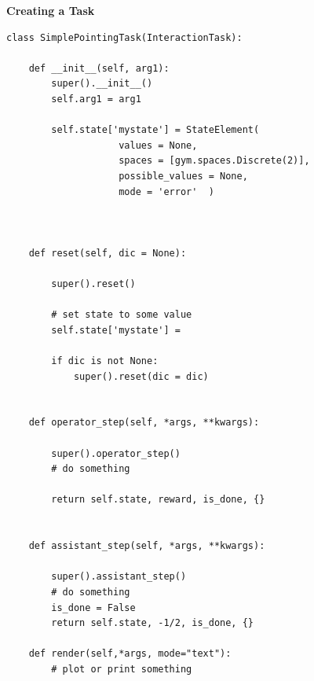 \documentclass[11pt, xcolor = {dvipsnames}]{beamer}
\begin{document}
\begin{frame}[fragile]{\textbf{Creating a Task}}
\begin{adjustbox}{height=.4\textheight}\lstset{language=Python}
\lstset{frame=lines}
\lstset{basicstyle=\footnotesize}
\begin{lstlisting}
class SimplePointingTask(InteractionTask):
 
    def __init__(self, arg1):
        super().__init__()
        self.arg1 = arg1

        self.state['mystate'] = StateElement(
                    values = None,
                    spaces = [gym.spaces.Discrete(2)],
                    possible_values = None,
                    mode = 'error'  )



    def reset(self, dic = None):
    
        super().reset()

        # set state to some value
        self.state['mystate'] =

        if dic is not None:
            super().reset(dic = dic)


    def operator_step(self, *args, **kwargs):
   
        super().operator_step()
        # do something

        return self.state, reward, is_done, {}


    def assistant_step(self, *args, **kwargs):
      
        super().assistant_step()
        # do something
        is_done = False
        return self.state, -1/2, is_done, {}

    def render(self,*args, mode="text"):
        # plot or print something

\end{lstlisting}
\end{adjustbox}
\end{frame}
\end{document}
